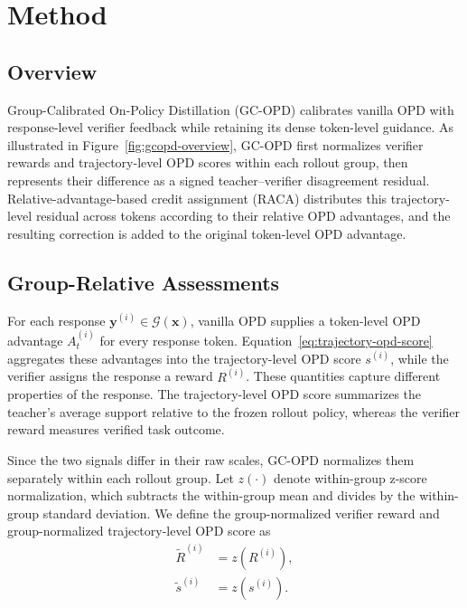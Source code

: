 \section{Method}

\subsection{Overview}

Group-Calibrated On-Policy Distillation (GC-OPD) calibrates vanilla OPD with response-level verifier feedback while retaining its dense token-level guidance. As illustrated in Figure~\ref{fig:gcopd-overview}, GC-OPD first normalizes verifier rewards and trajectory-level OPD scores within each rollout group, then represents their difference as a signed teacher--verifier disagreement residual. Relative-advantage-based credit assignment (RACA) distributes this trajectory-level residual across tokens according to their relative OPD advantages, and the resulting correction is added to the original token-level OPD advantage.

\subsection{Group-Relative Assessments}

For each response $\mathbf{y}^{(i)}\in\mathcal{G}(\mathbf{x})$, vanilla OPD supplies a token-level OPD advantage $A^{(i)}_t$ for every response token. Equation~\ref{eq:trajectory-opd-score} aggregates these advantages into the trajectory-level OPD score $s^{(i)}$, while the verifier assigns the response a reward $R^{(i)}$. These quantities capture different properties of the response. The trajectory-level OPD score summarizes the teacher's average support relative to the frozen rollout policy, whereas the verifier reward measures verified task outcome.

Since the two signals differ in their raw scales, GC-OPD normalizes them separately within each rollout group. Let $z(\cdot)$ denote within-group z-score normalization, which subtracts the within-group mean and divides by the within-group standard deviation. We define the group-normalized verifier reward and group-normalized trajectory-level OPD score as
\begin{equation}
\begin{split}
\tilde{R}^{(i)} &=z\left (R^{(i)} \right ),\\
\tilde{s}^{(i)} &=z\left (s^{(i)} \right ).
\end{split}
\label{eq:group-relative-signals}
\end{equation}

